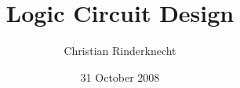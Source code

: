 %
\usepackage[english]{babel}

%
\usepackage{graphicx}

%
\usepackage{amssymb,amsmath}

%
\usepackage{xspace}
\usepackage{array}

%



%
\renewcommand{\refname}{}

%
\title{Logic Circuit Design}
\author{Christian Rinderknecht}
\date{31 October 2008}



\frame{\maketitle}



